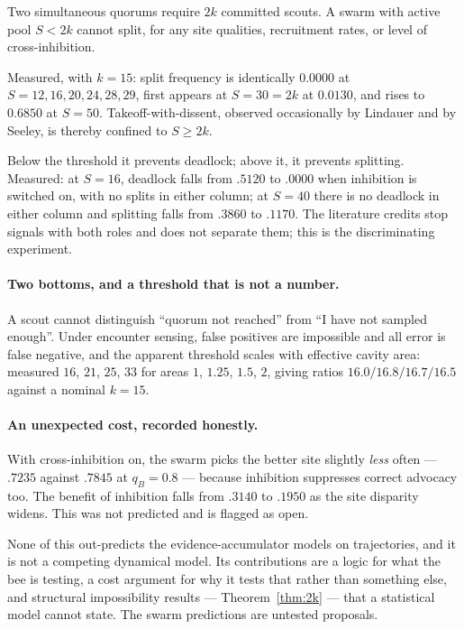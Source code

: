 \begin{theorem}
\label{thm:2k}
Two simultaneous quorums require $2k$ committed scouts. A swarm with active pool
$S < 2k$ cannot split, for any site qualities, recruitment rates, or level of
cross-inhibition.
\end{theorem}

Measured, with $k=15$: split frequency is identically $0.0000$ at
$S = 12,16,20,24,28,29$, first appears at $S = 30 = 2k$ at $0.0130$, and rises to
$0.6850$ at $S = 50$. Takeoff-with-dissent, observed occasionally by Lindauer and
by Seeley, is thereby confined to $S \ge 2k$.

\begin{principle}[Cross-inhibition changes jobs at $S = 2k$]
Below the threshold it prevents deadlock; above it, it prevents splitting.
Measured: at $S=16$, deadlock falls from $.5120$ to $.0000$ when inhibition is
switched on, with no splits in either column; at $S=40$ there is no deadlock in
either column and splitting falls from $.3860$ to $.1170$. The literature credits
stop signals with both roles and does not separate them; this is the
discriminating experiment.
\end{principle}

\paragraph{Two bottoms, and a threshold that is not a number.} A scout cannot
distinguish ``quorum not reached'' from ``I have not sampled enough''. Under
encounter sensing, false positives are impossible and all error is false negative,
and the apparent threshold scales with effective cavity area: measured $16$, $21$,
$25$, $33$ for areas $1$, $1.25$, $1.5$, $2$, giving ratios $16.0/16.8/16.7/16.5$
against a nominal $k=15$.

\paragraph{An unexpected cost, recorded honestly.} With cross-inhibition on, the
swarm picks the better site slightly \emph{less} often --- $.7235$ against $.7845$
at $q_{B} = 0.8$ --- because inhibition suppresses correct advocacy too. The
benefit of inhibition falls from $.3140$ to $.1950$ as the site disparity widens.
This was not predicted and is flagged as open.

\begin{remark}
None of this out-predicts the evidence-accumulator models on trajectories, and it
is not a competing dynamical model. Its contributions are a logic for what the bee
is testing, a cost argument for why it tests that rather than something else, and
structural impossibility results --- Theorem~\ref{thm:2k} --- that a statistical
model cannot state. The swarm predictions are untested proposals.
\end{remark}

